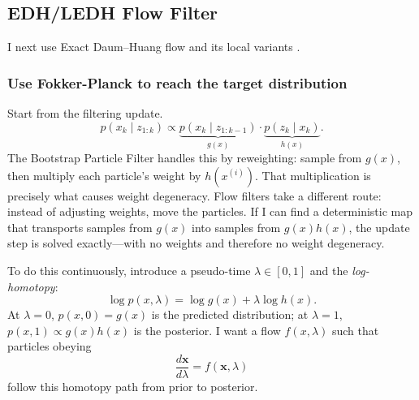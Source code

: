 \documentclass{article}
\renewcommand{\v}[1]{ \ensuremath{ {\mathbf{#1}} }}
\begin{document}

\subsection{EDH/LEDH Flow Filter}
I next use Exact Daum--Huang flow and its local variants \cite{daum2010exact,daum2011particle,Li-Particle-Filtering-2017}.
\subsubsection{Use Fokker-Planck to reach the target distribution}
Start from the filtering update.
\begin{equation}
    p(x_k \mid z_{1:k}) \propto \underbrace{p(x_k \mid z_{1:k-1})}_{g(x)} \cdot \underbrace{p(z_k \mid x_k)}_{h(x)}.
\end{equation}
The Bootstrap Particle Filter handles this by reweighting: sample from $g(x)$, then multiply each particle's weight by $h(x^{(i)})$. That multiplication is precisely what causes weight degeneracy. Flow filters \cite{daum2010exact,daum2011particle} take a different route: instead of adjusting weights, move the particles. If I can find a deterministic map that transports samples from $g(x)$ into samples from $g(x)h(x)$, the update step is solved exactly---with no weights and therefore no weight degeneracy.

To do this continuously, introduce a pseudo-time $\lambda \in [0,1]$ and the \textit{log-homotopy}:
\begin{equation}
    \log p(x,\lambda) = \log g(x) + \lambda \log h(x).
\end{equation}
At $\lambda=0$, $p(x,0) = g(x)$ is the predicted distribution; at $\lambda=1$, $p(x,1) \propto g(x)h(x)$ is the posterior. I want a flow $f(x,\lambda)$ such that particles obeying
\begin{equation}
    \frac{d\v{x}}{d\lambda} = f(\v{x},\lambda)
\end{equation}
follow this homotopy path from prior to posterior.
\end{document}
